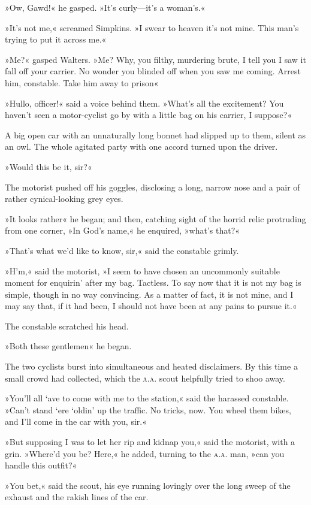 »Ow, Gawd!« he gasped. »It's curly—it's a woman's.«

»It's not me,« screamed Simpkins. »I swear to heaven it's not mine. This man's trying to put it across me.«

»Me?« gasped Walters. »Me? Why, you filthy, murdering brute, I tell you I saw it fall off your carrier. No wonder you blinded off when you saw me coming. Arrest him, constable. Take him away to prison\longdash«

»Hullo, officer!« said a voice behind them. »What's all the excitement? You haven't seen a motor-cyclist go by with a little bag on his carrier, I suppose?«

A big open car with an unnaturally long bonnet had slipped up to them, silent as an owl. The whole agitated party with one accord turned upon the driver.

»Would this be it, sir?«

The motorist pushed off his goggles, disclosing a long, narrow nose and a pair of rather cynical-looking grey eyes.

»It looks rather\longdash« he began; and then, catching sight of the horrid relic protruding from one corner, »In God's name,« he enquired, »what's that?«

»That's what we'd like to know, sir,« said the constable grimly.

»H'm,« said the motorist, »I seem to have chosen an uncommonly suitable moment for enquirin' after my bag. Tactless. To say now that it is not my bag is simple, though in no way convincing. As a matter of fact, it is not mine, and I may say that, if it had been, I should not have been at any pains to pursue it.«

The constable scratched his head.

»Both these gentlemen\longdash« he began.

The two cyclists burst into simultaneous and heated disclaimers. By this time a small crowd had collected, which the \textsc{a.a.} scout helpfully tried to shoo away.

»You'll all `ave to come with me to the station,« said the harassed constable. »Can't stand `ere `oldin' up the traffic. No tricks, now. You wheel them bikes, and I'll come in the car with you, sir.«

»But supposing I was to let her rip and kidnap you,« said the motorist, with a grin. »Where'd you be? Here,« he added, turning to the \textsc{a.a.} man, »can you handle this outfit?«

»You bet,« said the scout, his eye running lovingly over the long sweep of the exhaust and the rakish lines of the car.

